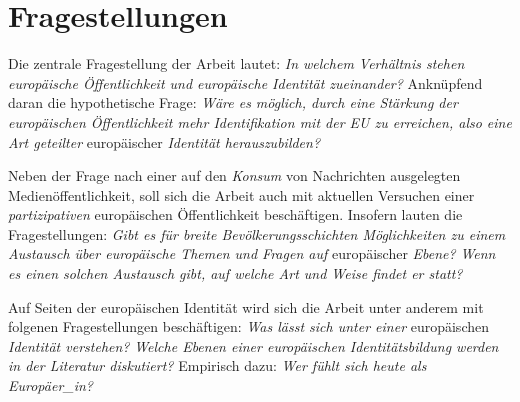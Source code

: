 \documentclass[a4paper, german, oneside]{scrartcl}
\begin{document}
\section{Fragestellungen}

Die zentrale Fragestellung der Arbeit lautet: \emph{In welchem Verhältnis stehen europäische Öffentlichkeit und europäische Identität zueinander?} Anknüpfend daran die hypothetische Frage: \emph{Wäre es möglich, durch eine Stärkung der europäischen Öffentlichkeit mehr Identifikation mit der EU zu erreichen, also eine Art geteilter} europäischer \emph{Identität herauszubilden?}



Neben der Frage nach einer auf den \emph{Konsum} von Nachrichten ausgelegten Medienöffentlichkeit, soll sich die Arbeit auch mit aktuellen Versuchen einer \emph{partizipativen} europäischen Öffentlichkeit beschäftigen. Insofern lauten die Fragestellungen: \emph{Gibt es für breite Bevölkerungsschichten Möglichkeiten zu einem Austausch über europäische Themen und Fragen auf} europäischer \emph{Ebene?} \emph{Wenn es einen solchen Austausch gibt, auf welche Art und Weise findet er statt?} 

Auf Seiten der europäischen Identität wird sich die Arbeit unter anderem mit folgenen Fragestellungen beschäftigen: \emph{Was lässt sich unter einer} europäischen \emph{Identität verstehen?} \emph{Welche Ebenen einer europäischen Identitätsbildung werden in der Literatur diskutiert?} Empirisch dazu: \emph{Wer fühlt sich heute als Europäer\_in?}




\end{document}
